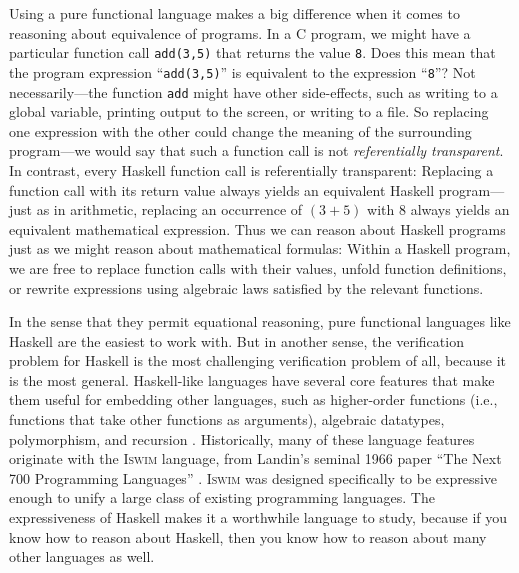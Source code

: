 Using a pure functional language makes a big difference when it comes to reasoning about equivalence of programs. In a C program, we might have a particular function call \texttt{add(3,5)} that returns the value \texttt{8}. Does this mean that the program expression ``\texttt{add(3,5)}'' is equivalent to the expression ``\texttt{8}''? Not necessarily---the function \texttt{add} might have other side-effects, such as writing to a global variable, printing output to the screen, or writing to a file. So replacing one expression with the other could change the meaning of the surrounding program---we would say that such a function call is not \emph{referentially transparent}. In contrast, every Haskell function call is referentially transparent: Replacing a function call with its return value always yields an equivalent Haskell program---just as in arithmetic, replacing an occurrence of $(3 + 5)$ with $8$ always yields an equivalent mathematical expression. 
Thus we can reason about Haskell programs just as we might reason about mathematical formulas: Within a Haskell program, we are free to replace function calls with their values, unfold function definitions, or rewrite expressions using algebraic laws satisfied by the relevant functions.

In the sense that they permit equational reasoning, pure functional languages like Haskell are the easiest to work with. But in another sense, the verification problem for Haskell is the most challenging verification problem of all, because it is the most general. Haskell-like languages have several core features that make them useful for embedding other languages, such as higher-order functions (i.e., functions that take other functions as arguments), algebraic datatypes, polymorphism, and recursion \cite{Hudak98}. Historically, many of these language features originate with the \textsc{Iswim} language, from Landin's seminal 1966 paper ``The Next 700 Programming Languages'' \cite{Landin66}. \textsc{Iswim} was designed specifically to be expressive enough to unify a large class of existing programming languages. The expressiveness of Haskell makes it a worthwhile language to study, because if you know how to reason about Haskell, then you know how to reason about many other languages as well.


